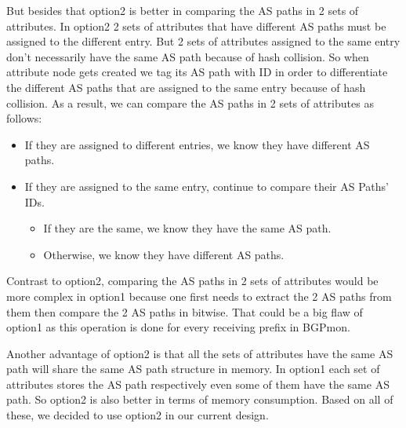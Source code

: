 But besides that option2 is better in comparing the AS paths in 2 sets of attributes. In option2 2 sets of attributes that have different AS paths must be assigned to the different entry. But  2 sets of attributes assigned to the same entry don't necessarily have the same AS path because of hash collision. So when attribute node gets created we tag its AS path with ID in order to differentiate the different AS paths that are assigned to the same entry because of hash collision. As a result, we can compare the AS paths in 2 sets of attributes as follows:
	\begin{itemize}
		\item{If they are assigned to different entries, we know they have different AS paths.}
		     \item{If they are assigned to the same entry, continue to compare their AS Paths' IDs.}
		\begin{itemize}
			\item{If they are the same, we know they have the same AS path.}			
				\item{Otherwise, we know they have different AS paths.}
		\end{itemize}
	\end{itemize}
Contrast to option2, comparing the AS paths in 2 sets of attributes would be more complex in option1 because one first needs to extract the 2 AS paths from them then compare the 2 AS paths in bitwise. That could be a big flaw of option1 as this operation is done for every receiving prefix in BGPmon.

Another advantage of option2 is that all the sets of attributes have the same AS path will share the same AS path structure in memory. In option1 each set of attributes stores the AS path respectively even some of them have the same AS path. So option2 is also better in terms of memory consumption.
Based on all of these, we decided to use option2 in our current design.
 
